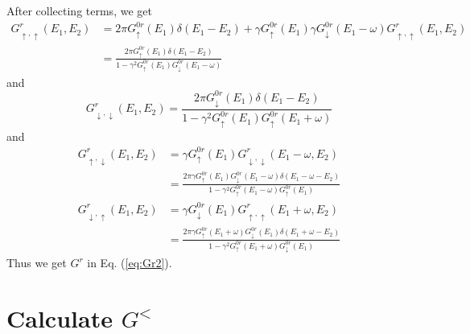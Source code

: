 \documentclass[11pt,a4paper]{article}
\begin{document}
After collecting terms, we get
\begin{equation}
\begin{split}
G_{ \uparrow, \uparrow}^{r}(E_{1}, E_{2}) &= 2 \pi G_{ \uparrow}^{0r}\left(E_{1}\right) \delta\left(E_{1}-E_{2}\right) + \gamma G_{ \uparrow}^{0r}\left(E_{1}\right) \gamma G_{\downarrow}^{0r}(E_{1}-\omega)G_{ \uparrow, \uparrow}^{r}\left(E_{1}, E_{2}\right) \\
&=\frac{2 \pi G_{ \uparrow}^{0r}\left(E_{1}\right) \delta\left(E_{1}-E_{2}\right)}{1-\gamma^{2} G_{ \uparrow}^{0r}\left(E_{1}\right) G_{ \downarrow}^{0r}\left(E_{1}-\omega\right)}
\end{split}
\end{equation}
and
\begin{equation}
G_{ \downarrow, \downarrow}^{r}(E_{1}, E_{2}) = \frac{2 \pi G_{ \downarrow}^{0r}\left(E_{1}\right) \delta\left(E_{1}-E_{2}\right)}{1-\gamma^{2} G_{ \uparrow}^{0r}\left(E_{1}\right) G_{ \uparrow}^{0r}\left(E_{1}+\omega\right)}
\end{equation}
and
\begin{equation}
\begin{split}
G_{ \uparrow, \downarrow}^{r}\left(E_{1}, E_{2}\right) &=  \gamma G_{ \uparrow}^{0r} \left(E_{1}\right)  G_{ \downarrow, \downarrow}^{r}(E_{1}-\omega,E_{2}) \\
&=\frac{2 \pi \gamma G_{ \uparrow}^{0r}\left(E_{1}\right) G_{ \downarrow}^{0r}\left(E_{1}-\omega\right) \delta\left(E_{1}-\omega-E_{2}\right) }{1-\gamma^{2} G_{ \uparrow}^{0r}\left(E_{1}-\omega\right) G_{ \uparrow}^{0r}\left(E_{1}\right) }
\end{split}
\end{equation}
\begin{equation}
\begin{split}
G_{ \downarrow, \uparrow}^{r}\left(E_{1}, E_{2}\right) &= \gamma G_{ \downarrow}^{0r} \left(E_{1}\right) G_{ \uparrow, \uparrow}^{r}(E_{1}+\omega,E_{2}) \\
&=\frac{2 \pi\gamma G_{ \uparrow}^{0r}\left(E_{1}+\omega\right) G_{ \downarrow}^{0r} \left(E_{1}\right) \delta(E_{1}+\omega-E_{2}) }{1-\gamma^{2} G_{ \uparrow}^{0r}\left(E_{1}+\omega\right) G_{ \downarrow}^{0r}\left(E_{1}\right)}
\end{split}
\end{equation}
Thus we get $G^{r}$ in Eq. (\ref{eq:Gr2}).
\section{Calculate $G^{<}$}
\end{document}
